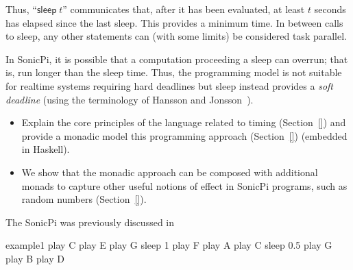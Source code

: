 \documentclass[preprint]{sigplanconf}
\newcommand{\note}[1]{{\color{blue}{#1}}}
\theoremstyle{definition}
\newcommand{\sleep}{\mathsf{sleep}\;}
\newcommand{\sleepOp}{\textsf{sleep}}
\newcommand{\lang}{SonicPi}
\begin{document}
Thus, ``$\sleep{} t$'' communicates that, after it has been evaluated, at least 
$t$ seconds has elapsed since the last \sleepOp{}. This provides a minimum
time. In between calls to \sleepOp{}, any other statements can (with some limits)
be considered task parallel. 

In \lang{}, it is possible that a computation proceeding a \sleepOp{}
can overrun; that is, run longer than the sleep time.  Thus, the
programming model is not suitable for realtime systems requiring hard
deadlines but \sleepOp{} instead provides a \emph{soft deadline} (using
the terminology of Hansson and Jonsson~\cite{hansson1994logic}).

\note{Contributions}

\begin{itemize}
\item Explain the core principles of the language related to timing
(Section~\ref{}) and provide a monadic model this programming approach
(Section~\ref{}) (embedded in Haskell).

\item We show that the monadic approach can be composed with
  additional monads to capture other useful notions of effect in
  \lang{} programs, such as random numbers (Section~\ref{}).
\end{itemize}

%
The \lang{} was previously discussed in~\cite{aaron2013sonic}

\begin{SaveVerbatim}{example1}
play C
play E
play G
sleep 1
play F
play A
play C
sleep 0.5
play G
play B
play D
\end{SaveVerbatim}
\end{document}
